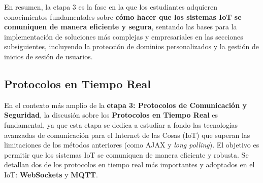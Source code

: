 \documentclass{report}
\begin{document}
En resumen, la etapa 3 es la fase en la que los estudiantes adquieren conocimientos fundamentales sobre \textbf{cómo hacer que los sistemas IoT se 
comuniquen de manera eficiente y segura}, sentando las bases para la implementación de soluciones más complejas y empresariales en las secciones 
subsiguientes, incluyendo la protección de dominios personalizados y la gestión de inicios de sesión de usuarios.

\subsection{Protocolos en Tiempo Real}
En el contexto más amplio de la \textbf{etapa 3: Protocolos de Comunicación y Seguridad}, la discusión sobre los \textbf{Protocolos en Tiempo Real} 
es fundamental, ya que esta etapa se dedica a estudiar a fondo las tecnologías avanzadas de comunicación para el Internet de las Cosas (IoT) que 
superan las limitaciones de los métodos anteriores (como AJAX y \textit{long polling}). El objetivo es permitir que los sistemas IoT se comuniquen 
de manera eficiente y robusta. Se detallan dos de los protocolos en tiempo real más importantes y adoptados en el IoT: \textbf{WebSockets} 
y \textbf{MQTT}.
\end{document}
